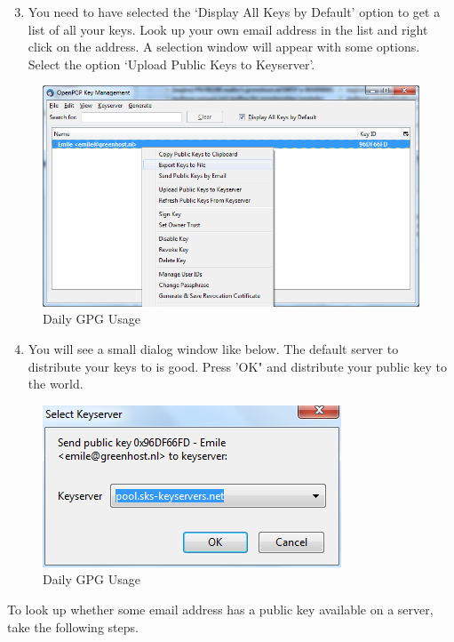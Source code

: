 \begin{enumerate}[1.]
\setcounter{enumi}{2}
\item
  You need to have selected the `Display All Keys by Default' option to
  get a list of all your keys. Look up your own email address in the
  list and right click on the address. A selection window will appear
  with some options. Select the option `Upload Public Keys to
  Keyserver'.
\end{enumerate}
\begin{figure}[htbp]
\centering
\includegraphics{daily_gpg_13.png}
\caption{Daily GPG Usage}
\end{figure}

\begin{enumerate}[1.]
\setcounter{enumi}{3}
\item
  You will see a small dialog window like below. The default server to
  distribute your keys to is good. Press 'OK" and distribute your public
  key to the world.
\end{enumerate}
\begin{figure}[htbp]
\centering
\includegraphics{daily_gpg_14.png}
\caption{Daily GPG Usage}
\end{figure}

To look up whether some email address has a public key available on a
server, take the following steps.

